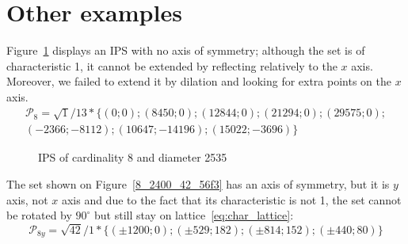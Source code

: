 \documentclass[12pt]{article}
\theoremstyle{theorem}
\theoremstyle{dfn}
\theoremstyle{remark}
\begin{document}



\section{Other examples}

Figure~\ref{8_2535_1_d680} displays an IPS with
no axis of symmetry;
although the set is of characteristic 1,
it cannot be extended by reflecting relatively to the $x$ axis.
Moreover, we failed to extend it by dilation and looking for extra points on the $x$ axis.
%
%
\begin{multline}
	\mathcal{P}_8=
	\sqrt{1}/13*
	\{
	( 0 ; 0);
	( 8450 ; 0);
	( 12844 ; 0);
	( 21294 ; 0);
	( 29575 ; 0);
	\\
	( -2366 ; -8112);
	( 10647 ; -14196);
	( 15022 ; -3696)
	\}
\end{multline}
%
\begin{figure}[h!]
\parbox{1\linewidth}{\caption{IPS of cardinality 8 and diameter 2535}
\label{8_2535_1_d680}}
\end{figure}

The set shown on Figure~\ref{8_2400_42_56f3} has an axis of symmetry, but it is $y$ axis, not $x$ axis
and due to the fact that its characteristic is not 1,
the set cannot be rotated by $90^\circ$ but still stay on lattice~\eqref{eq:char_lattice}:
\begin{equation}
	\mathcal{P}_{8y}=
	\sqrt{42}/1*\{( \pm1200 ; 0);
	( \pm529 ; 182);
	( \pm814 ; 152);
	( \pm440 ; 80)
	\}
\end{equation}
\end{document}
